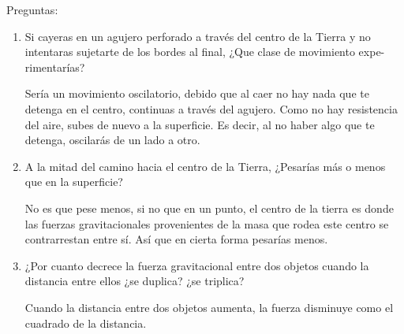 \documentclass[10pt, a4paper]{article}
\begin{document}
    Preguntas:
    \begin{enumerate}
        \item Si cayeras en un agujero perforado a través del centro de la Tierra y no
        intentaras sujetarte de los bordes al final, ¿Que clase de movimiento expe-
        rimentarías?

        \begin{center}
            Sería un movimiento oscilatorio, debido que al caer no hay nada que te detenga en el centro,
            continuas a través del agujero. Como no hay resistencia del aire, subes de nuevo a la superficie.
            Es decir, al no haber algo que te detenga, oscilarás de un lado a otro.
        \end{center}

        \item A la mitad del camino hacia el centro de la Tierra, ¿Pesarías más o menos
        que en la superficie?

        \begin{center}
            No es que pese menos, si no que en un punto, el centro de la tierra es donde las fuerzas
            gravitacionales provenientes de la masa que rodea este centro se contrarrestan entre sí.
            Así que en cierta forma pesarías menos.
        \end{center}

        \item ¿Por cuanto decrece la fuerza gravitacional entre dos objetos cuando la
        distancia entre ellos ¿se duplica? ¿se triplica?

        \begin{center}
            Cuando la distancia entre dos objetos aumenta, la fuerza disminuye como el cuadrado de 
            la distancia.
        \end{center}

    \end{enumerate}
\end{document}
